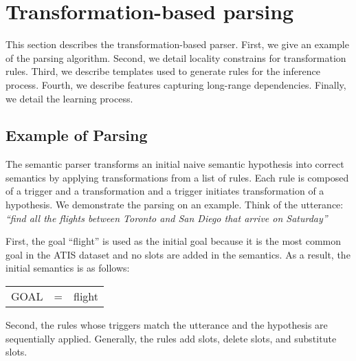\documentclass{article}
\begin{document}
\section{Transformation-based parsing} \label{sec:tbl}
This section describes the transformation-based parser. 
First, we give an example of the parsing algorithm. 
Second, we detail locality constrains for transformation rules.
Third, we describe templates used to generate rules for the inference process. 
Fourth, we describe features capturing long-range dependencies.
Finally, we detail the learning process. 

\subsection{Example of Parsing} \label{sec:tbl:example}
The semantic parser transforms an initial naive semantic hypothesis into correct semantics by applying transformations from a list of rules. Each rule is composed of a trigger and a transformation and a trigger initiates transformation of a hypothesis. 
We demonstrate the parsing on an example. Think of the utterance: \textit{``find all the flights between Toronto and San Diego that arrive on Saturday''} 

First, the goal ``flight'' is used as the initial goal because it is the most common goal in the ATIS dataset and no slots are added in the semantics. As a result, the initial semantics is as follows:

\vspace{.15cm}
\begin{tabular}{lll}
  GOAL & = & flight
\end{tabular} 
\vspace{.15cm}

Second, the rules whose triggers match the utterance and the hypothesis are sequentially applied. Generally, the rules add slots, delete slots, and substitute slots. 
\end{document}
